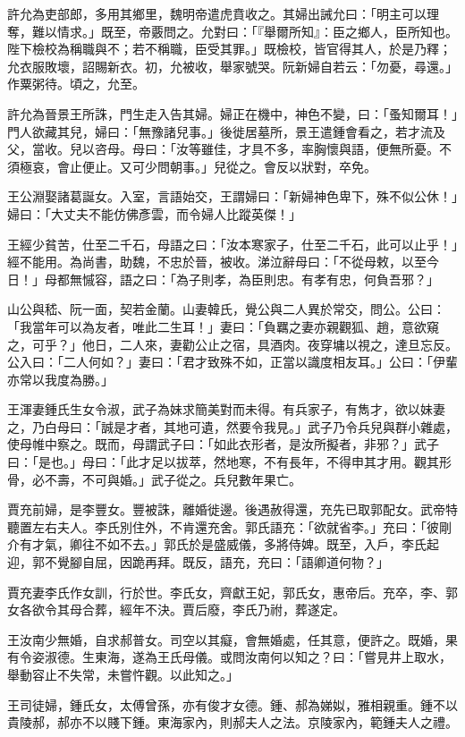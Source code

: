 許允為吏部郎，多用其鄉里，魏明帝遣虎賁收之。其婦出誡允曰：「明主可以理奪，難以情求。」既至，帝覈問之。允對曰：「『舉爾所知』：臣之鄉人，臣所知也。陛下檢校為稱職與不；若不稱職，臣受其罪。」既檢校，皆官得其人，於是乃釋；允衣服敗壞，詔賜新衣。初，允被收，舉家號哭。阮新婦自若云：「勿憂，尋還。」作粟粥待。頃之，允至。

許允為晉景王所誅，門生走入告其婦。婦正在機中，神色不變，曰：「蚤知爾耳！」門人欲藏其兒，婦曰：「無豫諸兒事。」後徙居墓所，景王遣鍾會看之，若才流及父，當收。兒以咨母。母曰：「汝等雖佳，才具不多，率胸懷與語，便無所憂。不須極哀，會止便止。又可少問朝事。」兒從之。會反以狀對，卒免。

王公淵娶諸葛誕女。入室，言語始交，王謂婦曰：「新婦神色卑下，殊不似公休！」婦曰：「大丈夫不能仿佛彥雲，而令婦人比蹤英傑！」

王經少貧苦，仕至二千石，母語之曰：「汝本寒家子，仕至二千石，此可以止乎！」經不能用。為尚書，助魏，不忠於晉，被收。涕泣辭母曰：「不從母敕，以至今日！」母都無慽容，語之曰：「為子則孝，為臣則忠。有孝有忠，何負吾邪？」

山公與嵇、阮一面，契若金蘭。山妻韓氏，覺公與二人異於常交，問公。公曰：「我當年可以為友者，唯此二生耳！」妻曰：「負羈之妻亦親觀狐、趙，意欲窺之，可乎？」他日，二人來，妻勸公止之宿，具酒肉。夜穿墉以視之，達旦忘反。公入曰：「二人何如？」妻曰：「君才致殊不如，正當以識度相友耳。」公曰：「伊輩亦常以我度為勝。」

王渾妻鍾氏生女令淑，武子為妹求簡美對而未得。有兵家子，有雋才，欲以妹妻之，乃白母曰：「誠是才者，其地可遺，然要令我見。」武子乃令兵兒與群小雜處，使母帷中察之。既而，母謂武子曰：「如此衣形者，是汝所擬者，非邪？」武子曰：「是也。」母曰：「此才足以拔萃，然地寒，不有長年，不得申其才用。觀其形骨，必不壽，不可與婚。」武子從之。兵兒數年果亡。

賈充前婦，是李豐女。豐被誅，離婚徙邊。後遇赦得還，充先已取郭配女。武帝特聽置左右夫人。李氏別住外，不肯還充舍。郭氏語充：「欲就省李。」充曰：「彼剛介有才氣，卿往不如不去。」郭氏於是盛威儀，多將侍婢。既至，入戶，李氏起迎，郭不覺腳自屈，因跪再拜。既反，語充，充曰：「語卿道何物？」

賈充妻李氏作女訓，行於世。李氏女，齊獻王妃，郭氏女，惠帝后。充卒，李、郭女各欲令其母合葬，經年不決。賈后廢，李氏乃祔，葬遂定。

王汝南少無婚，自求郝普女。司空以其癡，會無婚處，任其意，便許之。既婚，果有令姿淑德。生東海，遂為王氏母儀。或問汝南何以知之？曰：「嘗見井上取水，舉動容止不失常，未嘗忤觀。以此知之。」

王司徒婦，鍾氏女，太傅曾孫，亦有俊才女德。鍾、郝為娣姒，雅相親重。鍾不以貴陵郝，郝亦不以賤下鍾。東海家內，則郝夫人之法。京陵家內，範鍾夫人之禮。

